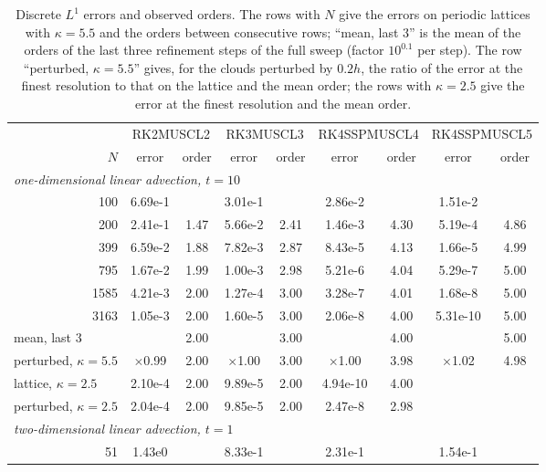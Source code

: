 \documentclass[11pt,a4paper]{article}
\numberwithin{equation}{section}
\begin{document}
\begin{table}[!htbp]
\centering
\caption{Discrete $L^1$ errors and observed orders. The rows with $N$ give the errors on periodic lattices with $\kappa=5.5$ and the orders between consecutive rows; ``mean, last 3'' is the mean of the orders of the last three refinement steps of the full sweep (factor $10^{0.1}$ per step). The row ``perturbed, $\kappa=5.5$'' gives, for the clouds perturbed by $0.2h$, the ratio of the error at the finest resolution to that on the lattice and the mean order; the rows with $\kappa=2.5$ give the error at the finest resolution and the mean order.}\label{tab:convergence}
\small
\setlength{\tabcolsep}{4.5pt}
\begin{tabular}{rcccccccc}
\toprule
& \multicolumn{2}{c}{RK2MUSCL2} & \multicolumn{2}{c}{RK3MUSCL3} & \multicolumn{2}{c}{RK4SSPMUSCL4} & \multicolumn{2}{c}{RK4SSPMUSCL5}\\
\cmidrule(lr){2-3}\cmidrule(lr){4-5}\cmidrule(lr){6-7}\cmidrule(lr){8-9}
$N$ & error & order & error & order & error & order & error & order\\
\midrule
\multicolumn{9}{l}{\emph{one-dimensional linear advection, $t=10$}}\\
100 & 6.69e-1 &  & 3.01e-1 &  & 2.86e-2 &  & 1.51e-2 & \\
200 & 2.41e-1 & 1.47 & 5.66e-2 & 2.41 & 1.46e-3 & 4.30 & 5.19e-4 & 4.86\\
399 & 6.59e-2 & 1.88 & 7.82e-3 & 2.87 & 8.43e-5 & 4.13 & 1.66e-5 & 4.99\\
795 & 1.67e-2 & 1.99 & 1.00e-3 & 2.98 & 5.21e-6 & 4.04 & 5.29e-7 & 5.00\\
1585 & 4.21e-3 & 2.00 & 1.27e-4 & 3.00 & 3.28e-7 & 4.01 & 1.68e-8 & 5.00\\
3163 & 1.05e-3 & 2.00 & 1.60e-5 & 3.00 & 2.06e-8 & 4.00 & 5.31e-10 & 5.00\\
\multicolumn{1}{l}{mean, last 3} &  & 2.00 &  & 3.00 &  & 4.00 &  & 5.00\\
\multicolumn{1}{l}{perturbed, $\kappa=5.5$} & $\times$0.99 & 2.00 & $\times$1.00 & 3.00 & $\times$1.00 & 3.98 & $\times$1.02 & 4.98\\
\multicolumn{1}{l}{lattice, $\kappa=2.5$} & 2.10e-4 & 2.00 & 9.89e-5 & 2.00 & 4.94e-10 & 4.00 &  & \\
\multicolumn{1}{l}{perturbed, $\kappa=2.5$} & 2.04e-4 & 2.00 & 9.85e-5 & 2.00 & 2.47e-8 & 2.98 &  & \\
\midrule
\multicolumn{9}{l}{\emph{two-dimensional linear advection, $t=1$}}\\
51 & 1.43e0 &  & 8.33e-1 &  & 2.31e-1 &  & 1.54e-1 & \\

\end{tabular}
\end{table}
\end{document}

